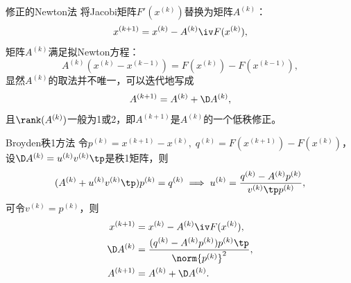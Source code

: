 \begin{theorem}
    {修正的Newton法}{}
    将Jacobi矩阵$F'(x^{(k)})$替换为矩阵$A^{(k)}$：
    \[
        x^{(k+1)}=x^{(k)}-{A^{(k)}}\iv F(x^{(k)}),
    \]
    矩阵$A^{(k)}$满足拟Newton方程：
    \begin{equation}
        A^{(k)}(x^{(k)}-x^{(k-1)})=F(x^{(k)})-F(x^{(k-1)}),
    \end{equation}
    显然$A^{(k)}$的取法并不唯一，可以迭代地写成
    \[
        A^{(k+1)}=A^{(k)}+\D A^{(k)},
    \]
    且$\rank(A^{(k)})$一般为1或2，即$A^{(k+1)}$是$A^{(k)}$的一个低秩修正。
\end{theorem}

\begin{theorem}
    {Broyden秩1方法}{}
    令$p^{(k)}=x^{(k+1)}-x^{(k)},\;q^{(k)}=F(x^{(k+1)})-F(x^{(k)})$，设$\D A^{(k)}=u^{(k)}{v^{(k)}}\tp$是秩1矩阵，则
    \[
        (A^{(k)}+u^{(k)}{v^{(k)}}\tp)p^{(k)}=q^{(k)}\implies u^{(k)}=\frac{q^{(k)}-A^{(k)}p^{(k)}}{{v^{(k)}}\tp p^{(k)}},
    \]
    可令$v^{(k)}=p^{(k)}$，则 
    \begin{subequations}
        \begin{align}
            x^{(k+1)}&=x^{(k)}-{A^{(k)}}\iv F(x^{(k)}),\\
            \D A^{(k)}&=\frac{(q^{(k)}-A^{(k)}p^{(k)}){p^{(k)}}\tp}{\norm{p^{(k)}}^2},\\
            A^{(k+1)}&=A^{(k)}+\D A^{(k)}.
        \end{align}
    \end{subequations}
\end{theorem}
